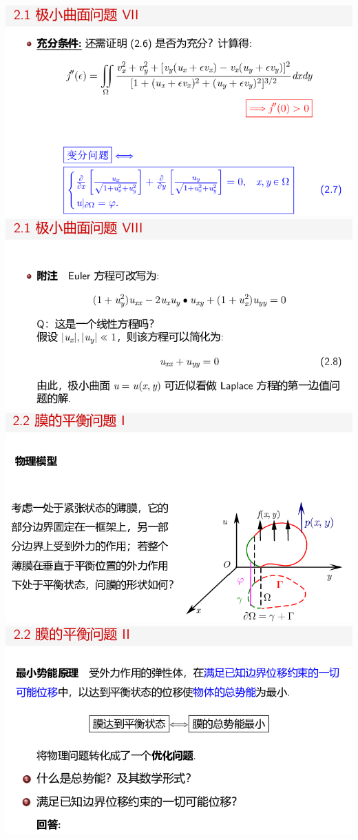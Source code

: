 \documentclass[11pt,a4paper]{ctexart}
\begin{document}
\begin{paracol}{2}
\includegraphics[width=\linewidth]{chap01_56.png}
\newpage
\includegraphics[width=\linewidth]{chap01_57.png}
\includegraphics[width=\linewidth]{chap01_58.png}
\includegraphics[width=\linewidth]{chap01_59.png}

\end{paracol}
\end{document}
